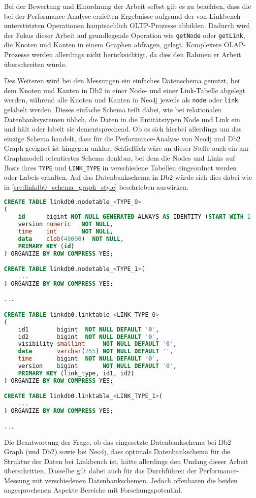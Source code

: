 Bei der Bewertung und Einordnung der Arbeit selbst gilt es zu beachten, dass die bei der Performance-Analyse erzielten Ergebnisse aufgrund der von Linkbench unterstützten Operationen hauptsächlich OLTP-Prozesse abbilden. Dadurch wird der Fokus dieser Arbeit auf grundlegende Operation wie \texttt{getNode} oder \texttt{getLink}, die Knoten und Kanten in einem Graphen abfragen, gelegt. Komplexere OLAP-Prozesse werden allerdings nicht berücksichtigt, da dies den Rahmen er Arbeit überschreiten würde. 

Des Weiteren wird bei den Messungen ein einfaches Datenschema genutzt, bei dem Knoten und Kanten in Db2 in einer Node- und einer Link-Tabelle abgelegt werden, während alle Knoten und Kanten in Neo4j jeweils als \texttt{node} oder \texttt{link} gelabelt werden. Dieses einfache Schema teilt dabei, wie bei relationalen Datenbanksystemen üblich, die Daten in die Entitätstypen Node und Link ein und hält oder labelt sie dementsprechend. Ob es sich hierbei allerdings um das einzige Schema handelt, dass für die Performance-Analyse von Neo4j und Db2 Graph geeignet ist hingegen unklar. Schließlich wäre an dieser Stelle auch ein am Graphmodell orientiertes Schema denkbar, bei dem die Nodes und Links auf Basis ihres \texttt{TYPE} und \texttt{LINK\_TYPE} in verschiedene Tabellen eingeordnet werden oder Labels erhalten. Auf das Datenbankschema in Db2 würde sich dies dabei wie in \autoref{src:linkdb0_schema_graph_style} beschrieben auswirken. 
\begin{lstlisting}[label=src:linkdb0_schema_graph_style,caption={Alternatives Datenbankschema für Db2},language=SQL]
CREATE TABLE linkdb0.nodetable_<TYPE_0>
(
    id      bigint NOT NULL GENERATED ALWAYS AS IDENTITY (START WITH 1 INCREMENT BY 1),
    version numeric   NOT NULL,
    time    int       NOT NULL,
    data    clob(48000)  NOT NULL,
    PRIMARY KEY (id)
) ORGANIZE BY ROW COMPRESS YES;

CREATE TABLE linkdb0.nodetable_<TYPE_1>(
    ...
) ORGANIZE BY ROW COMPRESS YES;

...

CREATE TABLE linkdb0.linktable_<LINK_TYPE_0>
(
    id1        bigint  NOT NULL DEFAULT '0',
    id2        bigint  NOT NULL DEFAULT '0',
    visibility smallint     NOT NULL DEFAULT '0',
    data       varchar(255) NOT NULL DEFAULT '',
    time       bigint  NOT NULL DEFAULT '0',
    version    bigint       NOT NULL DEFAULT '0',
    PRIMARY KEY (link_type, id1, id2)
) ORGANIZE BY ROW COMPRESS YES;

CREATE TABLE linkdb0.linktable_<LINK_TYPE_1>(
    ...
) ORGANIZE BY ROW COMPRESS YES;

...
\end{lstlisting}
Die Beantwortung der Frage, ob das eingesetzte Datenbankschema bei Db2 Graph (und Db2) sowie bei Neo4j, dass optimale Datenbankschema für die Struktur der Daten bei Linkbench ist, hätte allerdings den Umfang dieser Arbeit überschritten. Dasselbe gilt dabei auch für das Durchführen der Performance-Messung mit verschiedenen Datenbankschemen. Jedoch offenbaren die beiden angesprochenen Aspekte Bereiche mit Forschungspotential.

